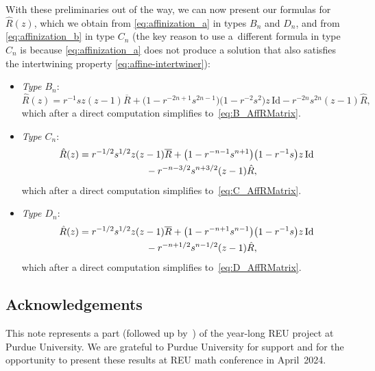 \documentclass[pdftex]{sigma}
\numberwithin{equation}{section}
\newcommand{\Id}{\mathrm{Id}}
\begin{document}
With these preliminaries out of the way, we can now present our formulas for $\hat{R}(z)$, which we obtain from \eqref{eq:affinization_a} in types $B_{n}$ and $D_{n}$, and from \eqref{eq:affinization_b} in type $C_{n}$ (the key reason to use a~different formula in type $C_n$ is because \eqref{eq:affinization_a} does not produce a solution that also satisfies the intertwining property \eqref{eq:affine-intertwiner}):
\begin{itemize}\itemsep=0pt
\item
\emph{Type $B_n$}:
\begin{displaymath}
 \hat{R}(z) =
 r^{-1}sz(z - 1)\overline{R} + \bigl(1 - r^{-2n + 1}s^{2n - 1}\bigr)\bigl(1 - r^{-2}s^{2}\bigr)z\,\Id - r^{-2n}s^{2n}(z - 1)\hat{R},
\end{displaymath}
which after a direct computation simplifies to~\eqref{eq:B_AffRMatrix}.

\item
\emph{Type $C_n$}:
\begin{gather*}
 \hat{R}(z) =
 r^{-1/2}s^{1/2}z(z-1)\overline{R} + \bigl(1 - r^{-n-1}s^{n + 1}\bigr)\bigl(1 - r^{-1}s\bigr)z\,\Id \\
 \hphantom{\hat{R}(z) =}{}
 - r^{-n - 3/2}s^{n+ 3/2}(z - 1)\hat{R},
\end{gather*}
which after a direct computation simplifies to~\eqref{eq:C_AffRMatrix}.

\item
\emph{Type $D_n$}:
\begin{gather*}
 \hat{R}(z) =
 r^{-1/2}s^{1/2}z(z-1)\overline{R} + \bigl(1 - r^{-n+1}s^{n-1}\bigr)\bigl(1 - r^{-1}s\bigr)z\,\Id \\
 \hphantom{\hat{R}(z) =}{}
 - r^{-n+1/2}s^{n-1/2}(z - 1)\hat{R},
\end{gather*}
which after a direct computation simplifies to~\eqref{eq:D_AffRMatrix}.
\end{itemize}

\subsection*{Acknowledgements}%

This note represents a part (followed up by~\cite{MT1,MT2}) of the year-long REU project at Purdue University. We are grateful to Purdue University for support and for the opportunity to present these results at REU math conference in April~2024.
\end{document}
